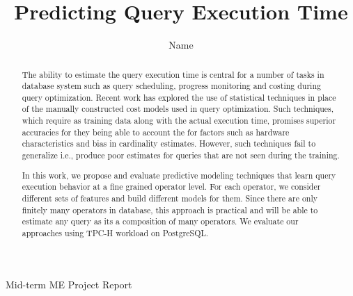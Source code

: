 \documentclass{article}
\title{\large \bf Predicting Query Execution Time }
\author{Name}
\date{}
\begin{document}
	\maketitle
    \begin{center}
        Mid-term ME Project Report
    \end{center}
        \vskip 12pt
	\thispagestyle{empty}
	
	\begin{abstract}
	The ability to estimate the query execution time is central for a number of tasks in database system
	such as query scheduling, progress monitoring and costing during query optimization. Recent work 
	has explored the use of statistical techniques in place of the manually constructed cost models used 
	in query optimization. Such techniques, which require as training data along with the 
	actual execution time, promises superior accuracies for they being able to account the for factors 
	such as hardware characteristics and bias in cardinality estimates. However, such techniques fail 
	to generalize i.e., produce poor estimates for queries that are not seen during the training.
	
	In this work, we propose and evaluate predictive modeling techniques that learn query 
	execution behavior at a fine grained operator level. For each operator, we consider different sets 
	of features and build different models for them. Since there are only finitely many operators in 
	database, this approach is practical and will be able to estimate any query as its a composition of
	many operators. We evaluate our approaches using TPC-H workload on PostgreSQL.

	\end{abstract}		
	\hfill 
\end{document}
